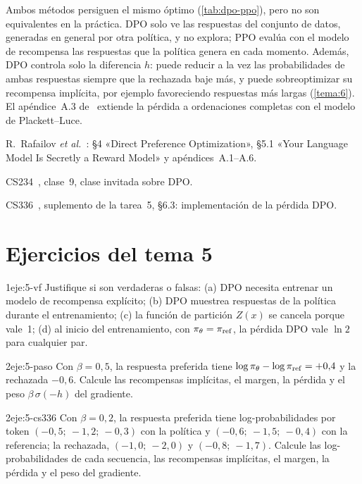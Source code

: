 Ambos métodos persiguen el mismo óptimo (\cref{tab:dpo-ppo}), pero no son equivalentes en la práctica. DPO solo ve las respuestas del conjunto de datos, generadas en general por otra política, y no explora; PPO evalúa con el modelo de recompensa las respuestas que la política genera en cada momento. Además, DPO controla solo la diferencia $h$: puede reducir a la vez las probabilidades de ambas respuestas siempre que la rechazada baje más, y puede sobreoptimizar su recompensa implícita, por ejemplo favoreciendo respuestas más largas (\cref{tema:6}). El apéndice~A.3 de~\cite{dpo} extiende la pérdida a ordenaciones completas con el modelo de Plackett--Luce.

\begin{lecturas}
\item R.~Rafailov \emph{et al.}~\cite{dpo}: §4 «Direct Preference Optimization», §5.1 «Your Language Model Is Secretly a Reward Model» y apéndices~A.1--A.6.
\item CS234~\cite{cs234}, clase~9, clase invitada sobre DPO.
\item CS336~\cite{cs336a5s}, suplemento de la tarea~5, §6.3: implementación de la pérdida DPO.
\end{lecturas}

\section*{Ejercicios del tema 5}

\begin{ejercicio}{1}{eje:5-vf}
Justifique si son verdaderas o falsas: (a) DPO necesita entrenar un modelo de recompensa explícito; (b) DPO muestrea respuestas de la política durante el entrenamiento; (c) la función de partición $Z(x)$ se cancela porque vale~1; (d) al inicio del entrenamiento, con $\pi_\theta=\pi_{\mathrm{ref}}$, la pérdida DPO vale $\ln 2$ para cualquier par.
\end{ejercicio}

\begin{ejercicio}{2}{eje:5-paso}
Con $\beta=0{,}5$, la respuesta preferida tiene $\log\pi_\theta-\log\pi_{\mathrm{ref}}=+0{,}4$ y la rechazada $-0{,}6$. Calcule las recompensas implícitas, el margen, la pérdida y el peso $\beta\,\sigma(-h)$ del gradiente.
\end{ejercicio}

\begin{ejercicio}{2}{eje:5-cs336}
Con $\beta=0{,}2$, la respuesta preferida tiene log-probabilidades por token $(-0{,}5;\ -1{,}2;\ -0{,}3)$ con la política y $(-0{,}6;\ -1{,}5;\ -0{,}4)$ con la referencia; la rechazada, $(-1{,}0;\ -2{,}0)$ y $(-0{,}8;\ -1{,}7)$. Calcule las log-probabilidades de cada secuencia, las recompensas implícitas, el margen, la pérdida y el peso del gradiente.
\end{ejercicio}

